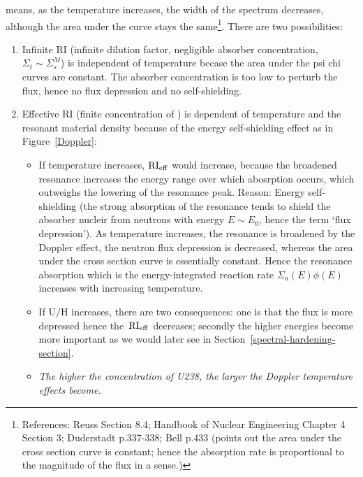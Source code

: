 \documentclass{school-22.211-notes}
\begin{document}
\clearpage
 means, as the temperature increases, the width of the spectrum decreases, although the area under the curve stays the same\footnote{References: Reuss Section 8.4; Handbook of Nuclear Engineering Chapter 4 Section 3; Duderstadt p.337-338; Bell p.433 (points out the area under the cross section curve is constant; hence the absorption rate is proportional to the magnitude of the flux in a sense.)}. 
There are two possibilities: 
\begin{enumerate}
\item Infinite RI (infinite dilution factor, negligible absorber concentration, $\Sigma_t \sim \Sigma_s^M$) is independent of temperature becase the area under the psi chi curves are constant. The absorber concentration is too low to perturb the flux, hence no flux depression and no self-shielding.  
\item Effective RI (finite concentration of ) is dependent of temperature and the resonant material density because of the energy self-shielding effect as in Figure~\ref{Doppler}: 
  \begin{itemize}
  \item If temperature increases, $\mathrm{RI}_{\mathrm{eff}}$ would increase, because the broadened resonance increases the energy range over which abosrption occurs, which outweighs the lowering of the resonance peak. Reason: Energy self-shielding (the strong absorption of the resonance tends to shield the absorber nucleir from neutrons with energy $E\sim E_0$, hence the term `flux depression').  As temperature increases, the resonance is broadened by the Doppler effect, the neutron flux depression is decreased, whereas the area under the cross section curve is essentially constant. Hence the resonance absorption which is the energy-integrated reaction rate $\Sigma_a(E) \phi(E)$ increases with increasing temperature. 
  \item If U/H increases, there are two consequences: one is that the flux is more depressed hence the $\left. \mathrm{RI}_{\mathrm{eff}} \right.$ decreases; secondly the higher energies become more important as we would later see in Section~\ref{spectral-hardening-section}. 
  \item \textit{The higher the concentration of U238, the larger the Doppler temperature effects become.}
  \end{itemize}
\end{enumerate}
\end{document}
